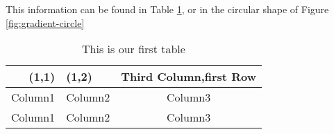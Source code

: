 This information can be found in Table \ref{tb:risk}, or in the circular shape of Figure \ref{fig:gradient-circle}
\begin{table}[h]
    \centering
    \begin{tabular}{r|lc}
        (1,1) & (1,2) & Third Column,first Row \\
        \hline
        Column1 & Column2 & Column3 \\
        Column1 & Column2 & Column3 \\
    \end{tabular}
    \caption{This is our first table}
    \label{tb:risk}
\end{table}